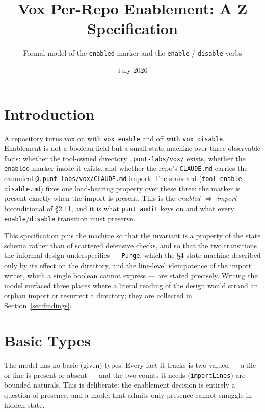 \documentclass[a4paper,10pt,fleqn]{article}
\begin{document}
\title{Vox Per-Repo Enablement: A Z Specification}
\author{Formal model of the \texttt{enabled} marker and the \texttt{enable} /
  \texttt{disable} verbs}
\date{July 2026}
\maketitle

\tableofcontents
\newpage

\section{Introduction}

A repository turns vox on with \texttt{vox enable} and off with
\texttt{vox disable}. Enablement is not a boolean field but a small state
machine over three observable facts: whether the tool-owned directory
\texttt{.punt-labs/vox/} exists, whether the \texttt{enabled} marker inside it
exists, and whether the repo's \texttt{CLAUDE.md} carries the canonical
\texttt{@.punt-labs/vox/CLAUDE.md} import. The standard
(\texttt{tool-enable-disable.md}) fixes one load-bearing property over these
three: the marker is present exactly when the import is present. This is the
\emph{enabled $\iff$ import} biconditional of \S2.11, and it is what
\texttt{punt audit} keys on and what every \texttt{enable}/\texttt{disable}
transition must preserve.

This specification pins the machine so that the invariant is a property of the
state schema rather than of scattered defensive checks, and so that the two
transitions the informal design underspecifies --- \texttt{Purge}, which the
\S4 state machine described only by its effect on the directory, and the
line-level idempotence of the import writer, which a single boolean cannot
express --- are stated precisely. Writing the model surfaced three places where
a literal reading of the design would strand an orphan import or resurrect a
directory; they are collected in Section~\ref{sec:findings}.

\section{Basic Types}

The model has no basic (given) types. Every fact it tracks is two-valued --- a
file or line is present or absent --- and the two counts it needs
(\texttt{importLines}) are bounded naturals. This is deliberate: the enablement
decision is entirely a question of presence, and a model that admits only
presence cannot smuggle in hidden state.
\end{document}
